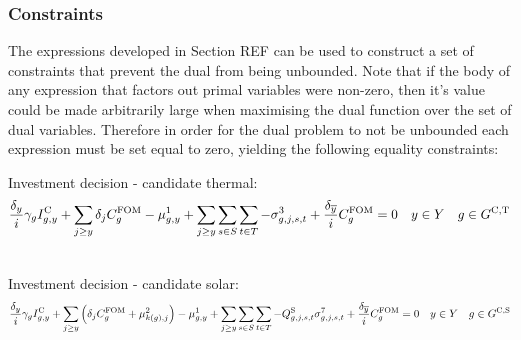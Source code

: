 \documentclass{article}
\begin{document}
\subsubsection{Constraints}
The expressions developed in Section REF can be used to construct a set of constraints that prevent the dual from being unbounded. Note that if the body of any expression that factors out primal variables were non-zero, then it's value could be made arbitrarily large when maximising the dual function over the set of dual variables. Therefore in order for the dual problem to not be unbounded each expression must be set equal to zero, yielding the following equality constraints:

Investment decision - candidate thermal:
\begin{align}
& \frac{\cDiscountRate}{\cInterestRate} \cAmortisationRate \cCandidateInvestmentCost + \sum\limits_{\iYearAlias \geq \iYear} \cDiscountRate[\iYearAlias] \cFixedOperationsMaintenanceCostGenerator - \dNonNegativeCandidateCapacity + \sum\limits_{\iYearAlias \geq \iYear} \sum\limits_{\iScenario \in \sScenarios} \sum\limits_{\iInterval \in \sIntervals} - \dMaxPowerOutputCandidateThermal[\iGenerator,\iYearAlias,\iScenario,\iInterval] + \frac{\cDiscountRate[\iYearTerminal]}{\cInterestRate}\cFixedOperationsMaintenanceCostGenerator = 0 \quad  \iYear \in \sYears \quad  \iGenerator \in \sGeneratorsCandidateThermal \\\nonumber
\label{eqn: dual candidate thermal investment}
\end{align}

Investment decision - candidate solar:
\begin{align}
& \frac{\cDiscountRate}{\cInterestRate} \cAmortisationRate \cCandidateInvestmentCost + \sum\limits_{\iYearAlias \geq \iYear} \left(\cDiscountRate[\iYearAlias] \cFixedOperationsMaintenanceCostGenerator + \dSolarBuildLimit[k(\iGenerator), \iYearAlias] \right) - \dNonNegativeCandidateCapacity 
+ \sum\limits_{\iYearAlias \geq \iYear} \sum\limits_{\iScenario \in \sScenarios} \sum\limits_{\iInterval \in \sIntervals} - \cCapacityFactorSolar[\iGenerator,\iYearAlias,\iScenario,\iInterval] \dMaxPowerOutputSolarCandidate[\iGenerator,\iYearAlias,\iScenario,\iInterval] + \frac{\cDiscountRate[\iYearTerminal]}{\cInterestRate}\cFixedOperationsMaintenanceCostGenerator = 0 \quad  \iYear \in \sYears \quad  \iGenerator \in \sGeneratorsCandidateSolar \\\nonumber
\end{align}
\end{document}
